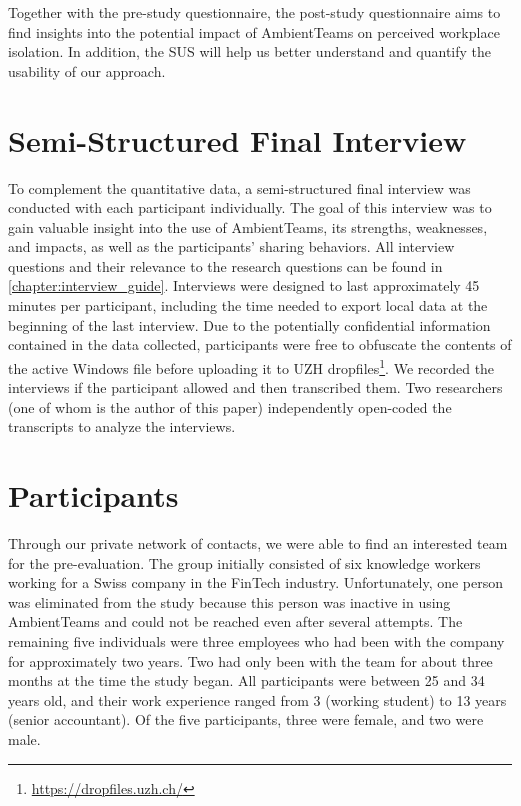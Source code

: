 Together with the pre-study questionnaire, the post-study questionnaire aims to find insights into the potential impact of AmbientTeams on perceived workplace isolation. In addition, the SUS will help us better understand and quantify the usability of our approach.

\section{Semi-Structured Final Interview}
\label{section:interview}
To complement the quantitative data, a semi-structured final interview was conducted with each participant individually. The goal of this interview was to gain valuable insight into the use of AmbientTeams, its strengths, weaknesses, and impacts, as well as the participants' sharing behaviors. All interview questions and their relevance to the research questions can be found in \autoref{chapter:interview_guide}. Interviews were designed to last approximately 45 minutes per participant, including the time needed to export local data at the beginning of the last interview. Due to the potentially confidential information contained in the data collected, participants were free to obfuscate the contents of the active Windows file before uploading it to UZH dropfiles\footnote{\url{https://dropfiles.uzh.ch/}}. We recorded the interviews if the participant allowed and then transcribed them. Two researchers (one of whom is the author of this paper) independently open-coded the transcripts to analyze the interviews.

\section{Participants}
Through our private network of contacts, we were able to find an interested team for the pre-evaluation. The group initially consisted of six knowledge workers working for a Swiss company in the FinTech industry. Unfortunately, one person was eliminated from the study because this person was inactive in using AmbientTeams and could not be reached even after several attempts. The remaining five individuals were three employees who had been with the company for approximately two years. Two had only been with the team for about three months at the time the study began. All participants were between 25 and 34 years old, and their work experience ranged from 3 (working student) to 13 years (senior accountant). Of the five participants, three were female, and two were male.